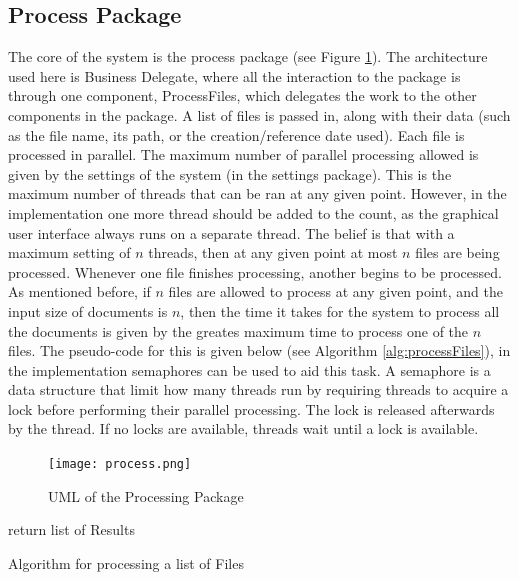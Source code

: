 \subsection{Process Package}
\par The core of the system is the process package (see Figure \ref{fig:process}). The architecture used here is Business Delegate, where all the interaction to the package is through one component, ProcessFiles, which delegates the work to the other components in the package. A list of files is passed in, along with their data (such as the file name, its path, or the creation/reference date used). Each file is processed in parallel. The maximum number of parallel processing allowed is given by the settings of the system (in the settings package). This is the maximum number of threads that can be ran at any given point. However, in the implementation one more thread should be added to the count, as the graphical user interface always runs on a separate thread. The belief is that with a maximum setting of $n$ threads, then at any given point at most $n$ files are being processed. Whenever one file finishes processing, another begins to be processed. As mentioned before, if $n$ files are allowed to process at any given point, and the input size of documents is $n$, then the time it takes for the system to process all the documents is given by the greates maximum time to process one of the $n$ files. The pseudo-code for this is given below (see Algorithm \ref{alg:processFiles}), in the implementation semaphores can be used to aid this task. A semaphore is a data structure that limit how many threads run by requiring threads to acquire a lock before performing their parallel processing. The lock is released afterwards by the thread. If no locks are available, threads wait until a lock is available.
\begin{figure}[H]
\caption{UML of the Processing Package}
\label{fig:process}
\texttt{[image: process.png]}
\centering
\end{figure}
\begin{algorithm}
return list of Results\;
\caption{Algorithm for processing a list of Files}
\label{alg:processFiles}
\end{algorithm}
